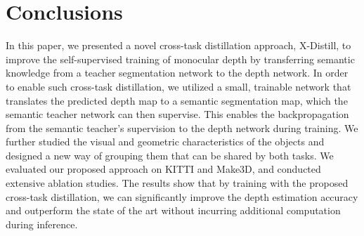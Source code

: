 \documentclass{bmvc2k}
\begin{document}
\section{Conclusions}\label{sec:conclusions}
\vspace{-7pt}
In this paper, we presented a novel cross-task distillation approach, X-Distill, to improve the self-supervised training of monocular depth by transferring semantic knowledge from a teacher segmentation network to the depth network. In order to enable such cross-task distillation, we utilized a small, trainable network that translates the predicted depth map to a semantic segmentation map, which the semantic teacher network can then supervise. This enables the backpropagation from the semantic teacher's supervision to the depth network during training. We further studied the visual and geometric characteristics of the objects and designed a new way of grouping them that can be shared by both tasks. We evaluated our proposed approach on KITTI and Make3D, and conducted extensive ablation studies. The results show that by training with the proposed cross-task distillation, we can significantly improve the depth estimation accuracy and outperform the state of the art without incurring additional computation during inference. 



\newpage

\end{document}
